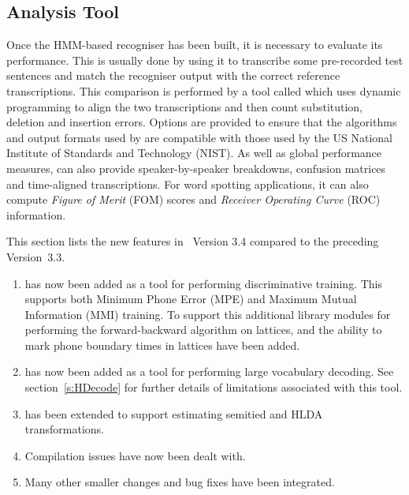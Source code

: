 \subsection{Analysis Tool}

Once the HMM-based recogniser has been built, it is necessary
to evaluate its performance.  This is usually done by using it
to transcribe some pre-recorded test sentences and match the
recogniser output with the correct reference transcriptions.
This comparison is performed by a tool called 
 which uses dynamic programming to align the two transcriptions
and then count substitution, deletion and insertion errors.
Options are provided to ensure that the
algorithms and output formats used 
by  are compatible
with those used by the US National Institute of Standards and Technology
(NIST).
As well as global performance measures,
 can also provide speaker-by-speaker breakdowns,
confusion matrices and time-aligned transcriptions.  For word spotting
applications, it can also compute \textit{Figure of Merit} (FOM) scores
and \textit{Receiver Operating Curve} (ROC) information.



This  section lists the new
features in \HTK\ Version 3.4 compared to the preceding Version~3.3.

\begin{enumerate}
\item {} has now been added as a tool for performing
discriminative training. This supports both Minimum Phone Error (MPE)
and Maximum Mutual Information (MMI) training. To support this
additional library modules for performing the forward-backward
algorithm on lattices, and the ability to mark phone boundary
times in lattices have been added.

\item {} has now been added as a tool for performing
large vocabulary decoding. See section~\ref{s:HDecode} for
further details of limitations associated with this tool.

\item {} has been extended to support estimating 
semitied and HLDA transformations.

\item Compilation issues have now been dealt with.

\item Many other smaller changes and bug fixes have been integrated.
\end{enumerate}

